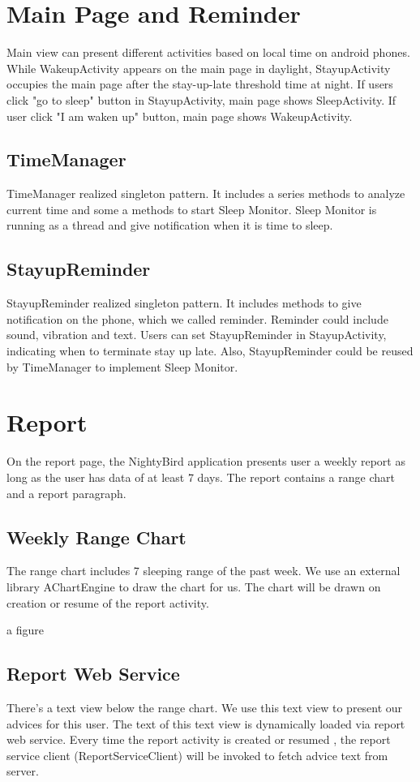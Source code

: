 \documentclass[14pt]{extreport}
\begin{document}
\chapter{Main Page and Reminder}
Main view can present different activities based on local time on android phones. While WakeupActivity appears on the main page in daylight, StayupActivity occupies the main page after the stay-up-late threshold time at night. If users click "go to sleep" button in StayupActivity, main page shows SleepActivity. If user click "I am waken up" button, main page shows WakeupActivity. 

\section{TimeManager}
TimeManager realized singleton pattern. It includes a series methods to analyze current time and some a methods to start Sleep Monitor. Sleep Monitor is running as a thread and give notification when it is time to sleep.

\section{StayupReminder}
StayupReminder realized singleton pattern. It includes methods to give notification on the phone, which we called reminder. Reminder could include sound, vibration and text. Users can set StayupReminder in StayupActivity, indicating when to terminate stay up late. Also, StayupReminder could be reused by TimeManager to implement Sleep Monitor.

\chapter{Report}
On the report page, the NightyBird application presents user a weekly report as long as the user has data of at least 7 days. The report contains a range chart and a report paragraph.
\section{Weekly Range Chart}
The range chart includes 7 sleeping range of the past week. We use an external library AChartEngine to draw the chart for us. The chart will be drawn on creation or resume of the report activity.

a figure

\section{Report Web Service}
There's a text view below the range chart. We use this text view to present our advices for this user. The text of this text view is dynamically loaded via report web service. Every time the report activity is created or resumed , the report service client (ReportServiceClient) will be invoked to fetch advice text from server. 
\end{document}
